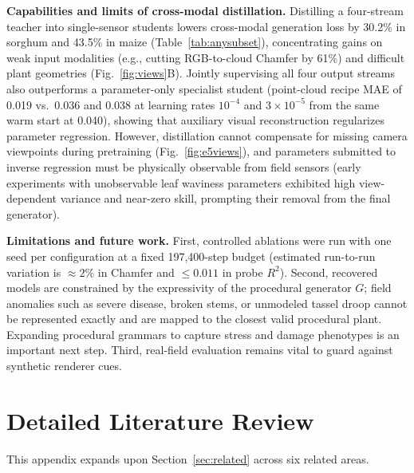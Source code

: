 \documentclass[10pt,twocolumn,letterpaper]{article}
\begin{document}
\noindent\textbf{Capabilities and limits of cross-modal distillation.}
Distilling a four-stream teacher into single-sensor students lowers cross-modal generation loss by 30.2\% in sorghum and 43.5\% in maize (Table~\ref{tab:anysubset}), concentrating gains on weak input modalities (e.g., cutting RGB-to-cloud Chamfer by 61\%) and difficult plant geometries (Fig.~\ref{fig:views}B). Jointly supervising all four output streams also outperforms a parameter-only specialist student (point-cloud recipe MAE of 0.019 vs.\ 0.036 and 0.038 at learning rates $10^{-4}$ and $3 \times 10^{-5}$ from the same warm start at 0.040), showing that auxiliary visual reconstruction regularizes parameter regression. However, distillation cannot compensate for missing camera viewpoints during pretraining (Fig.~\ref{fig:e5views}), and parameters submitted to inverse regression must be physically observable from field sensors (early experiments with unobservable leaf waviness parameters exhibited high view-dependent variance and near-zero skill, prompting their removal from the final generator).

\noindent\textbf{Limitations and future work.}
First, controlled ablations were run with one seed per configuration at a fixed 197{,}400-step budget (estimated run-to-run variation is $\approx 2\%$ in Chamfer and $\le 0.011$ in probe $R^2$). Second, recovered models are constrained by the expressivity of the procedural generator $G$; field anomalies such as severe disease, broken stems, or unmodeled tassel droop cannot be represented exactly and are mapped to the closest valid procedural plant. Expanding procedural grammars to capture stress and damage phenotypes is an important next step. Third, real-field evaluation remains vital to guard against synthetic renderer cues.

\section{Detailed Literature Review}
\label{app:litreview}

This appendix expands upon Section~\ref{sec:related} across six related areas.
\end{document}
